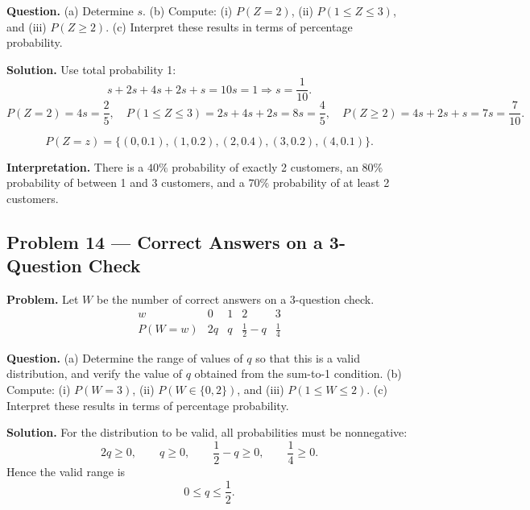 \begin{ExamProblems}
		\textbf{Question.}
		(a) Determine $s$.
		(b) Compute: (i) $P(Z=2)$, (ii) $P(1\le Z\le 3)$, and (iii) $P(Z\ge 2)$.
		(c) Interpret these results in terms of percentage probability.
		
		\textbf{Solution.}
		Use total probability 1:
		\[
		s+2s+4s+2s+s=10s=1\Rightarrow s=\frac{1}{10}.
		\]
		\[
		P(Z=2)=4s=\frac{2}{5},\quad
		P(1\le Z\le 3)=2s+4s+2s=8s=\frac{4}{5},\quad
		P(Z\ge 2)=4s+2s+s=7s=\frac{7}{10}.
		\]
		
\[
		P(Z=z)=\{(0,0.1),(1,0.2),(2,0.4),(3,0.2),(4,0.1)\}.
		\]
\begin{center}
		\end{center}
\textbf{Interpretation.} There is a $40\%$ probability of exactly 2 customers, an $80\%$ probability of between 1 and 3 customers, and a $70\%$ probability of at least 2 customers.
		
		
		\item
		\subsection*{Problem 14 — Correct Answers on a 3-Question Check}
		
		\textbf{Problem.}
		Let $W$ be the number of correct answers on a 3-question check.
		\[
		\begin{array}{c|cccc}
			w & 0 & 1 & 2 & 3\\
			\hline
			P(W=w) & 2q & q & \frac{1}{2}-q & \frac{1}{4}
		\end{array}
		\]
		
		\textbf{Question.}
		(a) Determine the range of values of $q$ so that this is a valid distribution, and verify the value of $q$ obtained from the sum-to-1 condition.
		(b) Compute: (i) $P(W=3)$, (ii) $P(W\in\{0,2\})$, and (iii) $P(1\le W\le 2)$.
		(c) Interpret these results in terms of percentage probability.
		
		\textbf{Solution.}
		For the distribution to be valid, all probabilities must be nonnegative:
		\[
		2q\ge 0,\qquad q\ge 0,\qquad \frac{1}{2}-q\ge 0,\qquad \frac{1}{4}\ge 0.
		\]
		Hence the valid range is
		\[
		0\le q\le \frac{1}{2}.
		\]
		

\end{ExamProblems}
